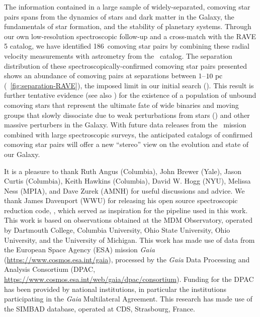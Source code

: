 \documentclass[modern, letterpaper]{aastex61}
\newcommand{\gaia}{\project{Gaia}}
\newcommand{\DR}[1]{\acronym{DR}#1}
\newcommand{\tgas}{\acronym{TGAS}}
\newcommand{\ncomovingtotal}{186}
\begin{document}
The information contained in a large sample of widely-separated, comoving star
pairs spans from the dynamics of stars and dark matter in the Galaxy, the
fundamentals of star formation, and the stability of planetary systems.
Through our own low-resolution spectroscopic follow-up and a cross-match with
the RAVE \DR{5} catalog, we have identified \ncomovingtotal\ comoving star pairs
by combining these radial velocity measurements with astrometry from the \tgas\
catalog.
The separation distribution of these spectroscopically-confirmed comoving star
pairs presented shows an abundance of comoving pairs at separations between
$1$--$10~\mathrm{pc}$ (\figurename~\ref{fig:separation-RAVE}), the imposed limit in our
initial search (\citealt{Oh:2017}).
This result is further tentative evidence (see also \citealt{Shaya:2011}) for
the existence of a population of unbound comoving stars that represent the
ultimate fate of wide binaries and moving groups that slowly dissociate due to
weak perturbations from stars (\citealt{Jiang:2010}) and other massive
perturbers in the Galaxy.
With future data releases from the \gaia\ mission combined with large
spectroscopic surveys, the anticipated catalogs of confirmed comoving star pairs
will offer a new ``stereo'' view on the evolution and state of our Galaxy.

\acknowledgements

It is a pleasure to thank
Ruth Angus (Columbia),
John Brewer (Yale),
Jason Curtis (Columbia),
Keith Hawkins (Columbia),
David W. Hogg (NYU),
Melissa Ness (MPIA), and
Dave Zurek (AMNH)
for useful discussions and advice.
We thank James Davenport (WWU) for releasing his open source spectroscopic
reduction code, \package{PyDIS}, which served as inspiration for the pipeline
used in this work.
This work is based on observations obtained at the MDM Observatory, operated by
Dartmouth College, Columbia University, Ohio State University, Ohio University,
and the University of Michigan.
This work has made use of data from the European Space Agency (ESA)
mission {\it Gaia} (\url{https://www.cosmos.esa.int/gaia}), processed by
the {\it Gaia} Data Processing and Analysis Consortium (DPAC,
\url{https://www.cosmos.esa.int/web/gaia/dpac/consortium}). Funding
for the DPAC has been provided by national institutions, in particular
the institutions participating in the {\it Gaia} Multilateral Agreement.
This research has made use of the SIMBAD database, operated at CDS, Strasbourg,
France.
\end{document}
